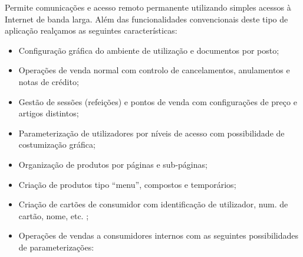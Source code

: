 \documentclass[a4paper,11pt,openany]{memoir}
\begin{document}
Permite comunicações e acesso remoto permanente utilizando simples acessos à Internet de banda larga.
Além das funcionalidades convencionais deste tipo de aplicação realçamos as seguintes características:
\begin{itemize}
\item Configuração gráfica do ambiente de utilização e documentos por posto;
\item Operações de venda normal com controlo de cancelamentos, anulamentos e notas de crédito;
\item Gestão de sessões (refeições) e pontos de venda com configurações de preço e artigos distintos;
\item Parameterização de utilizadores por níveis de acesso com possibilidade de costumização gráfica;
\item Organização de produtos por páginas e sub-páginas;

\item Criação de produtos tipo “menu”, compostos e temporários;

\item Criação de cartões de consumidor com identificação de utilizador, num. de cartão, nome, etc. ;

\item Operações de vendas a consumidores internos com as seguintes possibilidades de parameterizações:


\end{itemize}
\end{document}
